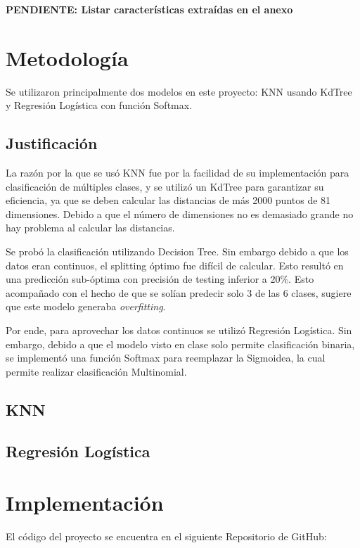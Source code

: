 \documentclass[conference]{IEEEtran}
\begin{document}
\textbf{PENDIENTE: Listar características extraídas en el anexo}

\section{Metodología}
Se utilizaron principalmente dos modelos en este proyecto: KNN usando KdTree y Regresión Logística con función Softmax.

\subsection{Justificación}
La razón por la que se usó KNN fue por la facilidad de su implementación para clasificación de múltiples clases, y se utilizó un KdTree para garantizar su eficiencia, ya que se deben calcular las distancias de más 2000 puntos de 81 dimensiones. Debido a que el número de dimensiones no es demasiado grande no hay problema al calcular las distancias.

Se probó la clasificación utilizando Decision Tree. Sin embargo debido a que los datos eran continuos, el splitting óptimo fue difícil de calcular. Esto resultó en una predicción sub-óptima con precisión de testing inferior a 20\%. Esto acompañado con el hecho de que se solían predecir solo 3 de las 6 clases, sugiere que este modelo generaba \textit{overfitting}.

Por ende, para aprovechar los datos continuos se utilizó Regresión Logística. Sin embargo, debido a que el modelo visto en clase solo permite clasificación binaria, se implementó una función Softmax para reemplazar la Sigmoidea, la cual permite realizar clasificación Multinomial.

\subsection{KNN}
\subsection{Regresión Logística}

\section{Implementación}
El código del proyecto se encuentra en el siguiente Repositorio de GitHub:
\end{document}
